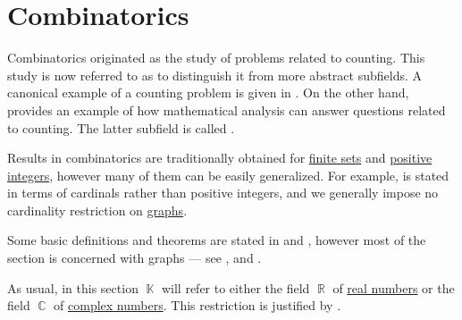 \section{Combinatorics}\label{sec:combinatorics}

Combinatorics originated as the study of problems related to counting. This study is now referred to as  to distinguish it from more abstract subfields. A canonical example of a counting problem is given in . On the other hand,  provides an example of how mathematical analysis can answer questions related to counting. The latter subfield is called .

Results in combinatorics are traditionally obtained for \hyperref[def:set_finiteness]{finite sets} and \hyperref[def:integer_signum]{positive integers}, however many of them can be easily generalized. For example,  is stated in terms of cardinals rather than positive integers, and we generally impose no cardinality restriction on \hyperref[def:directed_graph]{graphs}.

Some basic definitions and theorems are stated in  and , however most of the section is concerned with graphs --- see ,  and .

As usual, in this section \( \BbbK \) will refer to either the field \( \BbbR \) of \hyperref[def:real_numbers]{real numbers} or the field \( \BbbC \) of \hyperref[def:real_numbers]{complex numbers}. This restriction is justified by .

